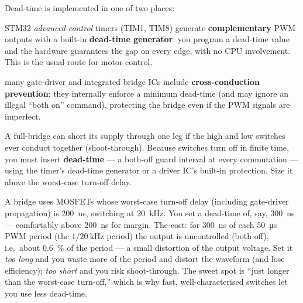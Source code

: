 \documentclass[11pt,a4paper,oneside]{book}
\begin{document}
Dead-time is implemented in one of two places:
\begin{description}[leftmargin=1.6cm,style=nextline]
  \item[Timer-based] STM32 \emph{advanced-control} timers (TIM1, TIM8) generate
        \textbf{complementary} PWM outputs with a built-in \textbf{dead-time
        generator}: you program a dead-time value and the hardware guarantees the
        gap on every edge, with no CPU involvement. This is the usual route for
        motor control.
  \item[Driver-based] many gate-driver and integrated bridge ICs include
        \textbf{cross-conduction prevention}: they internally enforce a minimum
        dead-time (and may ignore an illegal ``both on'' command), protecting the
        bridge even if the PWM signals are imperfect.
\end{description}

\begin{keyidea}
A full-bridge can short its supply through one leg if the high and low switches
ever conduct together (shoot-through). Because switches turn off in finite time,
you must insert \textbf{dead-time} --- a both-off guard interval at every
commutation --- using the timer's dead-time generator or a driver IC's built-in
protection. Size it above the worst-case turn-off delay.
\end{keyidea}

\begin{wexample}
A bridge uses MOSFETs whose worst-case turn-off delay (including gate-driver
propagation) is \qty{200}{\nano\second}, switching at \qty{20}{\kilo\hertz}. You
set a dead-time of, say, \qty{300}{\nano\second} --- comfortably above
\qty{200}{\nano\second} for margin. The cost: for \qty{300}{\nano\second} of each
\qty{50}{\micro\second} PWM period (the $1/\qty{20}{\kilo\hertz}$ period) the
output is uncontrolled (both off), i.e.\ about \qty{0.6}{\percent} of the period
--- a small distortion of the output voltage. Set it \emph{too long} and you waste
more of the period and distort the waveform (and lose efficiency); \emph{too
short} and you risk shoot-through. The sweet spot is ``just longer than the
worst-case turn-off,'' which is why fast, well-characterised switches let you use
less dead-time.
\end{wexample}
\end{document}
